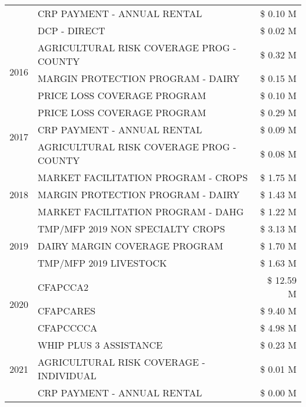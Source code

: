 \begin{tabular}{llr}
 & CRP PAYMENT - ANNUAL RENTAL & \$ 0.10 M \\
 & DCP - DIRECT & \$ 0.02 M \\
\cline{1-3}
\multirow[t]{3}{*}{2016} & AGRICULTURAL RISK COVERAGE PROG - COUNTY & \$ 0.32 M \\
 & MARGIN PROTECTION PROGRAM - DAIRY & \$ 0.15 M \\
 & PRICE LOSS COVERAGE PROGRAM & \$ 0.10 M \\
\cline{1-3}
\multirow[t]{3}{*}{2017} & PRICE LOSS COVERAGE PROGRAM & \$ 0.29 M \\
 & CRP PAYMENT - ANNUAL RENTAL & \$ 0.09 M \\
 & AGRICULTURAL RISK COVERAGE PROG - COUNTY & \$ 0.08 M \\
\cline{1-3}
\multirow[t]{3}{*}{2018} & MARKET FACILITATION PROGRAM - CROPS & \$ 1.75 M \\
 & MARGIN PROTECTION PROGRAM - DAIRY & \$ 1.43 M \\
 & MARKET FACILITATION PROGRAM - DAHG & \$ 1.22 M \\
\cline{1-3}
\multirow[t]{3}{*}{2019} & TMP/MFP 2019 NON SPECIALTY CROPS & \$ 3.13 M \\
 & DAIRY MARGIN COVERAGE PROGRAM & \$ 1.70 M \\
 & TMP/MFP 2019 LIVESTOCK & \$ 1.63 M \\
\cline{1-3}
\multirow[t]{3}{*}{2020} & CFAPCCA2 & \$ 12.59 M \\
 & CFAPCARES & \$ 9.40 M \\
 & CFAPCCCCA & \$ 4.98 M \\
\cline{1-3}
\multirow[t]{3}{*}{2021} & WHIP PLUS 3 ASSISTANCE & \$ 0.23 M \\
 & AGRICULTURAL RISK COVERAGE - INDIVIDUAL & \$ 0.01 M \\
 & CRP PAYMENT - ANNUAL RENTAL & \$ 0.00 M \\
\cline{1-3}
\bottomrule
\end{tabular}
